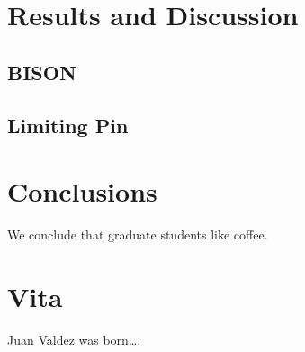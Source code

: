 \documentclass[edeposit,fullpage,11pt]{uiucthesis2009}
\begin{document}
\chapter{Results and Discussion}

\section{BISON}

\section{Limiting Pin}

\chapter{Conclusions}

We conclude that graduate students like coffee.

\backmatter



\chapter{Vita}

Juan Valdez was born\ldots.
\end{document}
